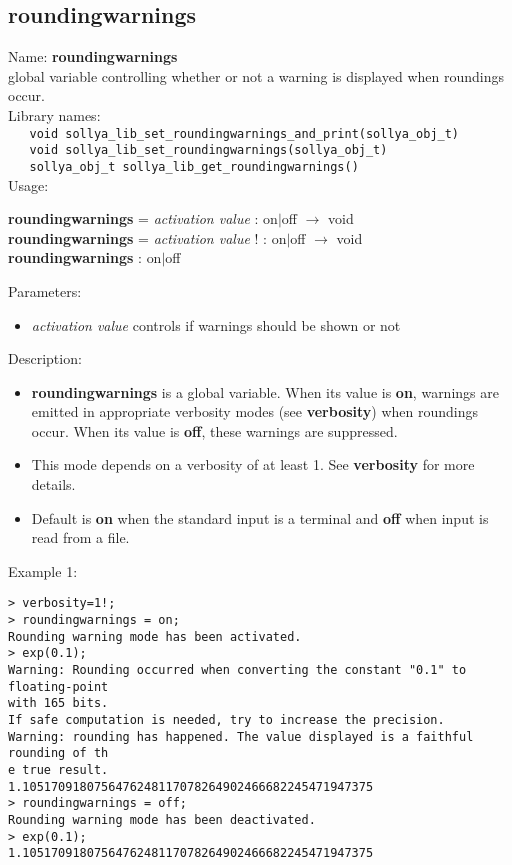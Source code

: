 \subsection{roundingwarnings}
\label{labroundingwarnings}
\noindent Name: \textbf{roundingwarnings}\\
\phantom{aaa}global variable controlling whether or not a warning is displayed when roundings occur.\\[0.2cm]
\noindent Library names:\\
\verb|   void sollya_lib_set_roundingwarnings_and_print(sollya_obj_t)|\\
\verb|   void sollya_lib_set_roundingwarnings(sollya_obj_t)|\\
\verb|   sollya_obj_t sollya_lib_get_roundingwarnings()|\\[0.2cm]
\noindent Usage: 
\begin{center}
\textbf{roundingwarnings} = \emph{activation value} : \textsf{on$|$off} $\rightarrow$ \textsf{void}\\
\textbf{roundingwarnings} = \emph{activation value} ! : \textsf{on$|$off} $\rightarrow$ \textsf{void}\\
\textbf{roundingwarnings} : \textsf{on$|$off}\\
\end{center}
Parameters: 
\begin{itemize}
\item \emph{activation value} controls if warnings should be shown or not
\end{itemize}
\noindent Description: \begin{itemize}

\item \textbf{roundingwarnings} is a global variable. When its value is \textbf{on}, warnings are
   emitted in appropriate verbosity modes (see \textbf{verbosity}) when roundings
   occur.  When its value is \textbf{off}, these warnings are suppressed.

\item This mode depends on a verbosity of at least 1. See
   \textbf{verbosity} for more details.

\item Default is \textbf{on} when the standard input is a terminal and
   \textbf{off} when \sollya input is read from a file.
\end{itemize}
\noindent Example 1: 
\begin{center}\begin{minipage}{15cm}\begin{Verbatim}[frame=single]
> verbosity=1!;
> roundingwarnings = on;
Rounding warning mode has been activated.
> exp(0.1);
Warning: Rounding occurred when converting the constant "0.1" to floating-point 
with 165 bits.
If safe computation is needed, try to increase the precision.
Warning: rounding has happened. The value displayed is a faithful rounding of th
e true result.
1.1051709180756476248117078264902466682245471947375
> roundingwarnings = off;
Rounding warning mode has been deactivated.
> exp(0.1);
1.1051709180756476248117078264902466682245471947375
\end{Verbatim}
\end{minipage}\end{center}
